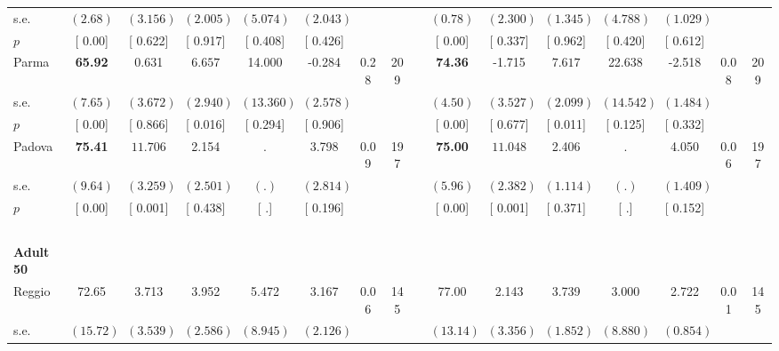 \begin{longtable}{L{8em} c c c c c c c p{1em} c c c c c c c}
\quad \quad \quad \quad s.e.& $ (     2.68)$ & $ (    3.156)$ & $ (    2.005)$ & $ (    5.074)$ & $ (    2.043)$ & & & & $ (     0.78)$ & $ (    2.300)$ & $ (    1.345)$ & $ (    4.788)$ & $ (    1.029)$ & &  \\*
\quad \quad \quad \quad $ p$ & [     0.00] & [    0.622] & [    0.917] & [    0.408] & [    0.426] & & & & [     0.00] & [    0.337] & [    0.962] & [    0.420] & [    0.612] & &  \\[1em]
\quad \quad \quad Parma& \textbf{    65.92} &     0.631 & $ \mathbf{    6.657}$ &    14.000 &    -0.284 &      0.28 &       209 & & \textbf{    74.36} &    -1.715 & $ \mathbf{    7.617}$ &    22.638 &    -2.518 &      0.08 &       209  \\*
\quad \quad \quad \quad s.e.& $ (     7.65)$ & $ (    3.672)$ & $ (    2.940)$ & $ (   13.360)$ & $ (    2.578)$ & & & & $ (     4.50)$ & $ (    3.527)$ & $ (    2.099)$ & $ (   14.542)$ & $ (    1.484)$ & &  \\*
\quad \quad \quad \quad $ p$ & [     0.00] & [    0.866] & [    0.016] & [    0.294] & [    0.906] & & & & [     0.00] & [    0.677] & [    0.011] & [    0.125] & [    0.332] & &  \\[1em]
\quad \quad \quad Padova& \textbf{    75.41} & $ \mathbf{   11.706}$ &     2.154 &         . &     3.798 &      0.09 &       197 & & \textbf{    75.00} & $ \mathbf{   11.048}$ &     2.406 &         . &     4.050 &      0.06 &       197  \\*
\quad \quad \quad \quad s.e.& $ (     9.64)$ & $ (    3.259)$ & $ (    2.501)$ & $ (        .)$ & $ (    2.814)$ & & & & $ (     5.96)$ & $ (    2.382)$ & $ (    1.114)$ & $ (        .)$ & $ (    1.409)$ & &  \\*
\quad \quad \quad \quad $ p$ & [     0.00] & [    0.001] & [    0.438] & [        .] & [    0.196] & & & & [     0.00] & [    0.001] & [    0.371] & [        .] & [    0.152] & &  \\[1em]
~\\[1em]
\quad \quad \textbf{Adult 50} & & & & & & & & & & & & & & & \\* 
\quad \quad \quad Reggio& 72.65 &     3.713 &     3.952 &     5.472 &     3.167 &      0.06 &       145 & & 77.00 &     2.143 &     3.739 &     3.000 &     2.722 &      0.01 &       145  \\*
\quad \quad \quad \quad s.e.& $ (    15.72)$ & $ (    3.539)$ & $ (    2.586)$ & $ (    8.945)$ & $ (    2.126)$ & & & & $ (    13.14)$ & $ (    3.356)$ & $ (    1.852)$ & $ (    8.880)$ & $ (    0.854)$ & &  \\*

\end{longtable}
